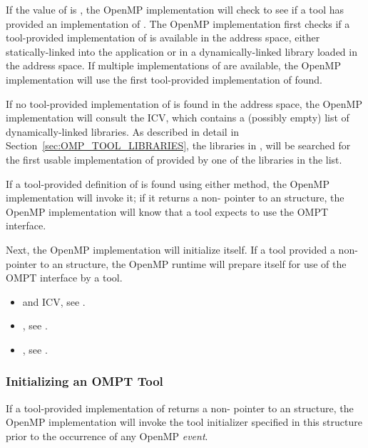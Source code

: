 If the value of  is , the OpenMP
implementation will check to see if a tool has provided an
implementation of .  The OpenMP implementation first
checks if a tool-provided implementation of  is
available in the address space, either statically-linked into the
application or in a dynamically-linked library loaded in the address
space. If multiple implementations of  are available,
the OpenMP implementation will use the first tool-provided
implementation of  found.

If no tool-provided implementation of  is found in
the address space, the OpenMP implementation will consult the
 ICV, which contains a (possibly empty) list
of dynamically-linked libraries.  As described in detail in
Section~\ref{sec:OMP_TOOL_LIBRARIES}, the libraries in
, will be searched for the first usable
implementation of  provided by one of the libraries
in the list.

If a tool-provided definition of  is found using
either method, the OpenMP implementation will invoke it; if it returns
a non- pointer to an  structure,
the OpenMP implementation will know
that a tool expects to use the OMPT interface.

Next, the OpenMP implementation will initialize itself. If a tool
provided a non- pointer to an  structure,
the OpenMP runtime will prepare itself for use of the OMPT interface by a tool.

\crossreferences
\begin{itemize}
\item {} and  ICV, see .
\item {}, see .
\item {}, see .
\end{itemize}

\subsubsection{Initializing an OMPT Tool}
\label{sec:tool-initialize}

If a tool-provided implementation of  returns a
non- pointer to an  structure,
the OpenMP implementation will invoke the tool initializer specified
in this structure prior to the occurrence of any OpenMP \emph{event}.

